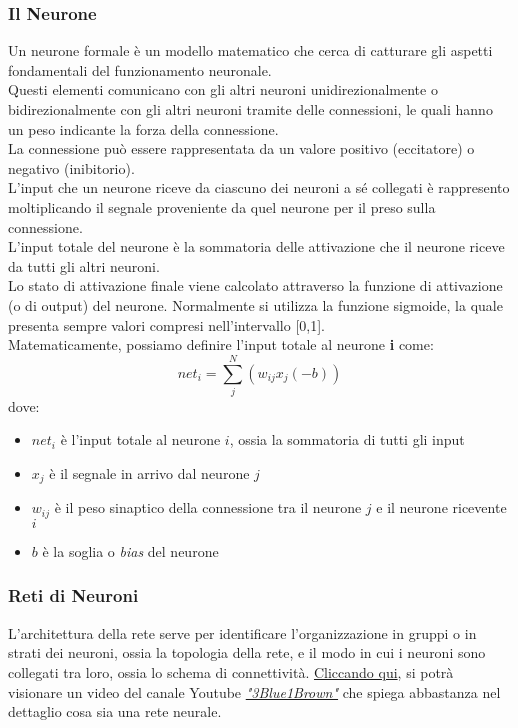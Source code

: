 \subsubsection{Il Neurone}
Un neurone formale è un modello matematico che cerca di catturare gli aspetti fondamentali del funzionamento neuronale.\\
Questi elementi comunicano con gli altri neuroni unidirezionalmente o bidirezionalmente con gli altri neuroni tramite delle connessioni, le quali hanno un peso indicante la forza della connessione.\\
La connessione può essere rappresentata da un valore positivo (eccitatore) o negativo (inibitorio).\\
L'input che un neurone riceve da ciascuno dei neuroni a sé collegati è rappresento moltiplicando il segnale proveniente da quel neurone per il preso sulla connessione.\\
L'input totale del neurone è la sommatoria delle attivazione che il neurone riceve da tutti gli altri neuroni.\\
Lo stato di attivazione finale viene calcolato attraverso la funzione di attivazione (o di output) del neurone. Normalmente si utilizza la funzione sigmoide, la quale presenta sempre valori compresi nell'intervallo [0,1].\\
Matematicamente, possiamo definire l'input totale al neurone \textbf{i} come:
\[net_i=\sum_j^N(w_{ij} x_j(-b))\]
dove:
\begin{itemize}
    \item \(net_i\) è l'input totale al neurone \(i\), ossia la sommatoria di tutti gli input
    \item \(x_j\) è il segnale in arrivo dal neurone \(j\)
    \item \(w_{ij}\) è il peso sinaptico della connessione tra il neurone \(j\) e il neurone ricevente \(i\)
    \item \(b\) è la soglia o \textit{bias} del neurone
\end{itemize}

\subsubsection{Reti di Neuroni}
L'architettura della rete serve per identificare l'organizzazione in gruppi o in strati dei neuroni, ossia la topologia della rete, e il modo in cui i neuroni sono collegati tra loro, ossia lo schema di connettività.
\href{https://www.youtube.com/watch?v=aircAruvnKk}{Cliccando qui}, si potrà visionare un video del canale Youtube \href{https://www.youtube.com/channel/UCYO_jab_esuFRV4b17AJtAw}{\textit{"3Blue1Brown"}} che spiega abbastanza nel dettaglio cosa sia una rete neurale.

